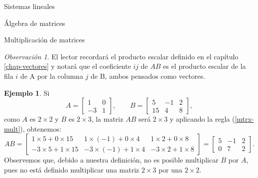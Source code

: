 \documentclass[a4paper,12pt,twoside,spanish,reqno]{amsbook}
\theoremstyle{definition}
\newtheorem{ejemplo}{Ejemplo}[section]
\theoremstyle{remark}
\newtheorem{obs}{Observaci\'on}[section]
\begin{document}
\begin{chapter}{Sistemas lineales}
\begin{section}{Álgebra de matrices}
\begin{subsection}{Multiplicación de matrices}
\begin{obs}
					El lector recordará el producto escalar definido en  el capítulo \ref{chap-vectores} y notará que el coeficiente $ij$ de $AB$ es el producto escalar de la fila $i$ de A por la columna $j$ de B, ambos pensados como vectores. 
				\end{obs}	
				
				\begin{ejemplo}
					Si 
					\begin{equation*}
						A = \begin{bmatrix}1&0\\-3&1\end{bmatrix}, \qquad B = \begin{bmatrix}5&-1&2\\15&4&8\end{bmatrix},
					\end{equation*}
					como $A$ es $2 \times 2$ y $B$ es $2 \times 3$, la matriz $AB$ será $2 \times 3$ y  aplicando la regla (\ref{mtrx-mult}), obtenemos:
					\begin{equation*}
						AB = \begin{bmatrix}1\times  5 + 0\times 15&1\times (-1) + 0\times 4&1\times 2 + 0\times 8
							\\-3\times 5 + 1\times 15&-3\times (-1) + 1\times 4&-3\times 2 + 1\times 8
						\end{bmatrix} =
						\begin{bmatrix} 5 &-1 &2 
							\\ 0 &7 &2
						\end{bmatrix}.
					\end{equation*}
					Observemos que, debido a nuestra definición, no es posible multiplicar $B$ por $A$, pues no está definido multiplicar una matriz $2 \times 3$ por una $2 \times 2$.
				\end{ejemplo}
				 	

\end{subsection}
\end{section}
\end{chapter}
\end{document}
